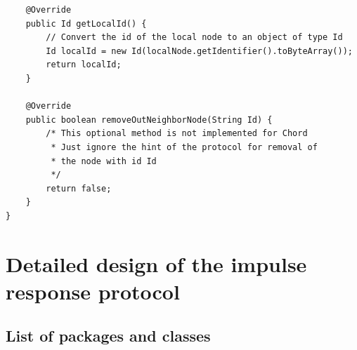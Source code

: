 \documentclass[a4paper,11pt,twoside]{report}
\begin{document}
\begin{appendices}
\begin{lstlisting}
	@Override
	public Id getLocalId() {
		// Convert the id of the local node to an object of type Id
		Id localId = new Id(localNode.getIdentifier().toByteArray());
		return localId;
	}

	@Override
	public boolean removeOutNeighborNode(String Id) {
		/* This optional method is not implemented for Chord
	 	 * Just ignore the hint of the protocol for removal of 
		 * the node with id Id 
		 */
		return false;
	}
}
\end{lstlisting}

\chapter{Detailed design of the impulse response protocol}

\section{List of packages and classes}

\begin{figure} [H]
\centering
{}\hfill
{}
\end{figure}


\end{appendices}
\end{document}
